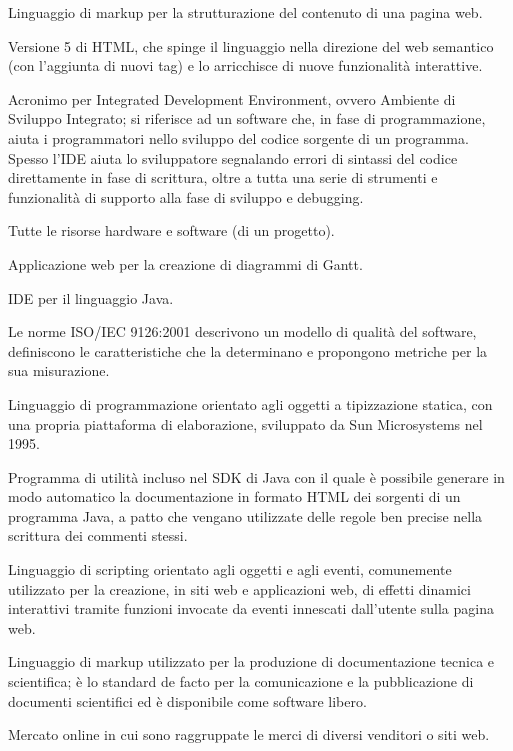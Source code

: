 \item[HTML] Linguaggio di markup per la strutturazione del contenuto di una pagina web.
\item[HTML5] Versione 5 di HTML, che spinge il linguaggio nella direzione del web semantico (con l'aggiunta di nuovi tag) e lo arricchisce di nuove funzionalità interattive.
\item[IDE]  Acronimo per Integrated Development Environment, ovvero Ambiente di Sviluppo Integrato; si riferisce ad un software che, in fase di programmazione, aiuta i programmatori nello sviluppo del codice sorgente di un programma. Spesso l'IDE aiuta lo sviluppatore segnalando errori di sintassi del codice direttamente in fase di scrittura, oltre a tutta una serie di strumenti e funzionalità di supporto alla fase di sviluppo e debugging.
\item[infrastruttura] Tutte le risorse hardware e software (di un progetto).
\item[Instagantt] Applicazione web per la creazione di diagrammi di Gantt.
\item[IntelliJ Idea] IDE per il linguaggio Java.
\item[ISO/IEC 9126:2001] Le norme ISO/IEC 9126:2001 descrivono un modello di qualità del software, definiscono le caratteristiche che la determinano e propongono metriche per la sua misurazione.
\item[Java] Linguaggio di programmazione orientato agli oggetti a tipizzazione statica, con una propria piattaforma di elaborazione, sviluppato da Sun Microsystems nel 1995.
\item[Javadoc] Programma di utilità incluso nel SDK di Java con il quale è possibile generare in modo automatico la documentazione in formato HTML dei sorgenti di un programma Java, a patto che vengano utilizzate delle regole ben precise nella scrittura dei commenti stessi.
\item[JavaScript] Linguaggio di scripting orientato agli oggetti e agli eventi, comunemente utilizzato per la creazione, in siti web e applicazioni web, di effetti dinamici interattivi tramite funzioni invocate da eventi innescati dall’utente sulla pagina web.
\item[Latex] Linguaggio di markup utilizzato per la produzione di documentazione tecnica e scientifica; è lo standard de facto per la comunicazione e la pubblicazione di documenti scientifici ed è disponibile come software libero.
\item[marketplace] Mercato online in cui sono raggruppate le merci di diversi venditori o siti web.
